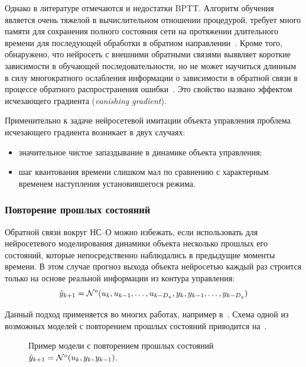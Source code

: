 Однако в литературе отмечаются и недостатки BPTT.  Алгоритм обучения
является очень тяжелой в вычислительном отношении процедурой, требует
много памяти для сохранения полного состояния сети на протяжении
длительного времени для последующей обработки в обратном
направлении~\cite{levinar95}.  Кроме того, обнаружено, что нейросеть с
внешними обратными связями выявляет короткие зависимости в обучающей
последовательности, но не может научиться длинным в силу многократного
ослабления информации о зависимости в обратной связи в процессе
обратного распространения ошибки~\cite{linetal}.  Это свойство названо
эффектом исчезающего градиента ({\em vanishing gradient}).

Применительно к задаче нейросетевой имитации объекта управления
проблема исчезающего градиента возникает в двух случаях:
\begin{itemize}\label{simple-feedback-defects}
  \item значительное чистое запаздывание в динамике объекта
  управления;
  \item шаг квантования времени слишком мал по сравнению с
  характерным временем наступления установившегося режима.
\end{itemize}

\subsubsection{Повторение прошлых состояний}

Обратной связи вокруг НС--О можно избежать, если использовать для
нейросетевого моделирования динамики объекта несколько прошлых его
состояний, которые непосредственно наблюдались в предыдущие моменты
времени.  В этом случае прогноз выхода объекта нейросетью каждый раз
строится только на основе реальной информации из контура управления:
\begin{equation}\label{eq:past-states}
  \hat{y}_{k+1}=\NN^o(u_k, u_{k-1},\ldots,u_{k-D_u}, y_k,
                           y_{k-1},\ldots, y_{k-D_y})
\end{equation}

Данный подход применяется во многих работах, например
в~\cite{kulee96,levinar95}.  Схема одной из возможных моделей с
повторением прошлых состояний приводится
на~.

\begin{figure}[h]
  \centering
  
  \caption{Пример модели с повторением прошлых состояний
  $\hat{y}_{k+1}=\mathcal{N}^o(u_k, y_k, y_{k-1})$.}
  \label{fig:nnp-past-states}
\end{figure}

